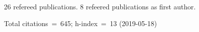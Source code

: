 26 refereed publications. 8 refeered publications as first author.

Total citations~=~645; h-index~=~13 (2019-05-18)